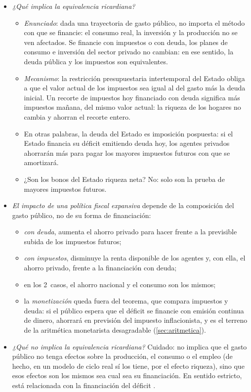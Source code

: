 \documentclass[11pt]{article}
\begin{document}
\begin{itemize}
\item \emph{¿Qué implica la equivalencia ricardiana?}
  \begin{itemize}
  \item \emph{Enunciado}: dada una trayectoria de gasto público, no importa el método con que se financie: el consumo real, la inversión y la producción no se ven afectados. Se financie con impuestos o con deuda, los planes de consumo e inversión del sector privado no cambian: en ese sentido, la deuda pública y los impuestos son equivalentes.
  \item \emph{Mecanismo}: la restricción presupuestaria intertemporal del Estado obliga a que el valor actual de los impuestos sea igual al del gasto más la deuda inicial. Un recorte de impuestos hoy financiado con deuda significa más impuestos mañana, del mismo valor actual: la riqueza de los hogares no cambia y ahorran el recorte entero.
  \item En otras palabras, la deuda del Estado es imposición pospuesta: si el Estado financia su déficit emitiendo deuda hoy, los agentes privados ahorrarán más para pagar los mayores impuestos futuros con que se amortizará.
  \item ¿Son los bonos del Estado riqueza neta? No: solo son la prueba de mayores impuestos futuros.
  \end{itemize}
\item \emph{El impacto de una política fiscal expansiva} depende de la composición del gasto público, no de su forma de financiación:
  \begin{itemize}
  \item \emph{con deuda}, aumenta el ahorro privado para hacer frente a la previsible subida de los impuestos futuros;
  \item \emph{con impuestos}, disminuye la renta disponible de los agentes y, con ella, el ahorro privado, frente a la financiación con deuda;
  \item en los 2~casos, el ahorro nacional y el consumo son los mismos;
  \item la \emph{monetización} queda fuera del teorema, que compara impuestos y deuda: si el público espera que el déficit se financie con emisión continua de dinero, ahorrará en previsión del impuesto inflacionista, y es el terreno de la aritmética monetarista desagradable (\ref{sec:aritmetica}).
  \end{itemize}
\item \emph{¿Qué no implica la equivalencia ricardiana?} Cuidado: no implica que el gasto público no tenga efectos sobre la producción, el consumo o el empleo (de hecho, en un modelo de ciclo real sí los tiene, por el efecto riqueza), sino que esos efectos son los mismos sea cual sea su financiación\nocite{BaxterKing1993Fiscal}. En sentido estricto, está relacionada con la financiación del déficit .
\end{itemize}
\end{document}
